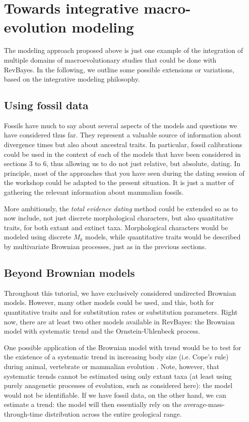 \section{Towards integrative macro-evolution modeling}

The modeling approach proposed above is just one example of the integration of multiple domains of macroevolutionary studies that could be done with RevBayes.
In the following, we outline some possible extensions or variations, based on the integrative modeling philosophy.

\subsection{Using fossil data}

Fossils have much to say about several aspects of the models and questions we have considered thus far.
They represent a valuable source of information about divergence times but also about ancestral traits.
In particular, fossil calibrations could be used in the context of each of the models that have been considered in sections 3 to 6, thus allowing us to do not just relative, but absolute, dating. In principle, most of the approaches that you have seen during the dating session of the workshop could be adapted to the present situation. It is just a matter of gathering the relevant information about mammalian fossils.

More ambitiously, the \emph{total evidence dating} method \citep{Ronquist:2012ea} could be extended so as to now include, not just discrete morphological characters, but also quantitative traits, for both extant and extinct taxa. Morphological characters would be modeled using discrete $M_k$ models, while quantitative traits would be described by multivariate Brownian processes, just as in the previous sections.

\subsection{Beyond Brownian models}

Throughout this tutorial, we have exclusively considered undirected Brownian models.
However, many other models could be used,
and this,
both for quantitative traits and for substitution rates or substitution parameters.
Right now, there are at least two other models available in RevBayes:
the Brownian model with systematic trend and the Ornstein-Uhlenbeck process.

One possible application of the Brownian model with trend would be to test for the existence of a systematic trend in increasing body size (i.e. Cope's rule) during animal, vertebrate or mammalian evolution \citep{Alroy:1998p270}. Note, however, that systematic trends cannot be estimated using only extant taxa (at least using purely anagenetic processes of evolution, such as considered here): the model would not be identifiable.
If we have fossil data, on the other hand, we can estimate a trend:
the model will then essentially rely on the average-mass-through-time distribution across the entire geological range.

